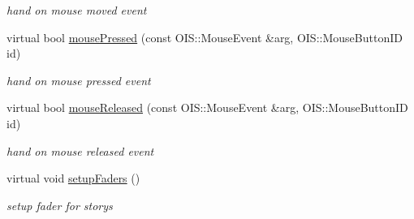 \begin{DoxyCompactItemize}
\begin{DoxyCompactList}\small\item\em hand on mouse moved event \end{DoxyCompactList}\item 
\hypertarget{class_stage_extra_ab223c91346f95912524dbd29898312da}{
virtual bool \hyperlink{class_stage_extra_ab223c91346f95912524dbd29898312da}{mousePressed} (const OIS::MouseEvent \&arg, OIS::MouseButtonID id)}
\label{class_stage_extra_ab223c91346f95912524dbd29898312da}

\begin{DoxyCompactList}\small\item\em hand on mouse pressed event \end{DoxyCompactList}\item 
\hypertarget{class_stage_extra_a9eed58c3dbfd4aa836a5e00c1c316f13}{
virtual bool \hyperlink{class_stage_extra_a9eed58c3dbfd4aa836a5e00c1c316f13}{mouseReleased} (const OIS::MouseEvent \&arg, OIS::MouseButtonID id)}
\label{class_stage_extra_a9eed58c3dbfd4aa836a5e00c1c316f13}

\begin{DoxyCompactList}\small\item\em hand on mouse released event \end{DoxyCompactList}\item 
\hypertarget{class_stage_extra_aa8143d3bb85caccd212014d792096070}{
virtual void \hyperlink{class_stage_extra_aa8143d3bb85caccd212014d792096070}{setupFaders} ()}
\label{class_stage_extra_aa8143d3bb85caccd212014d792096070}

\begin{DoxyCompactList}\small\item\em setup fader for storys \end{DoxyCompactList}\end{DoxyCompactItemize}
